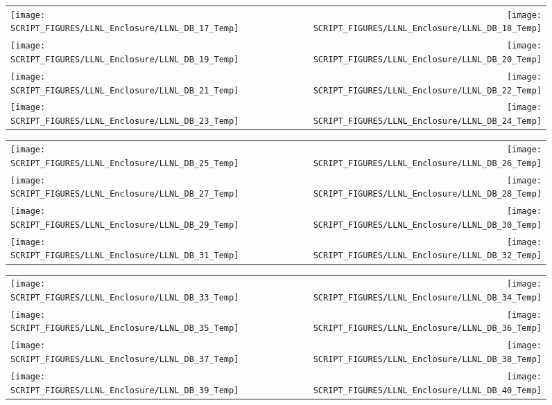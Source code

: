 \begin{figure}[!ht]
\begin{tabular*}{\textwidth}{l@{\extracolsep{\fill}}r}
\texttt{[image: SCRIPT\_FIGURES/LLNL\_Enclosure/LLNL\_DB\_17\_Temp]} &
\texttt{[image: SCRIPT\_FIGURES/LLNL\_Enclosure/LLNL\_DB\_18\_Temp]} \\
\texttt{[image: SCRIPT\_FIGURES/LLNL\_Enclosure/LLNL\_DB\_19\_Temp]} &
\texttt{[image: SCRIPT\_FIGURES/LLNL\_Enclosure/LLNL\_DB\_20\_Temp]} \\
\texttt{[image: SCRIPT\_FIGURES/LLNL\_Enclosure/LLNL\_DB\_21\_Temp]} &
\texttt{[image: SCRIPT\_FIGURES/LLNL\_Enclosure/LLNL\_DB\_22\_Temp]} \\
\texttt{[image: SCRIPT\_FIGURES/LLNL\_Enclosure/LLNL\_DB\_23\_Temp]} &
\texttt{[image: SCRIPT\_FIGURES/LLNL\_Enclosure/LLNL\_DB\_24\_Temp]}
\end{tabular*}
\end{figure}

\begin{figure}[!ht]
\begin{tabular*}{\textwidth}{l@{\extracolsep{\fill}}r}
\texttt{[image: SCRIPT\_FIGURES/LLNL\_Enclosure/LLNL\_DB\_25\_Temp]} &
\texttt{[image: SCRIPT\_FIGURES/LLNL\_Enclosure/LLNL\_DB\_26\_Temp]} \\
\texttt{[image: SCRIPT\_FIGURES/LLNL\_Enclosure/LLNL\_DB\_27\_Temp]} &
\texttt{[image: SCRIPT\_FIGURES/LLNL\_Enclosure/LLNL\_DB\_28\_Temp]} \\
\texttt{[image: SCRIPT\_FIGURES/LLNL\_Enclosure/LLNL\_DB\_29\_Temp]} &
\texttt{[image: SCRIPT\_FIGURES/LLNL\_Enclosure/LLNL\_DB\_30\_Temp]} \\
\texttt{[image: SCRIPT\_FIGURES/LLNL\_Enclosure/LLNL\_DB\_31\_Temp]} &
\texttt{[image: SCRIPT\_FIGURES/LLNL\_Enclosure/LLNL\_DB\_32\_Temp]}
\end{tabular*}
\end{figure}

\begin{figure}[!ht]
\begin{tabular*}{\textwidth}{l@{\extracolsep{\fill}}r}
\texttt{[image: SCRIPT\_FIGURES/LLNL\_Enclosure/LLNL\_DB\_33\_Temp]} &
\texttt{[image: SCRIPT\_FIGURES/LLNL\_Enclosure/LLNL\_DB\_34\_Temp]} \\
\texttt{[image: SCRIPT\_FIGURES/LLNL\_Enclosure/LLNL\_DB\_35\_Temp]} &
\texttt{[image: SCRIPT\_FIGURES/LLNL\_Enclosure/LLNL\_DB\_36\_Temp]} \\
\texttt{[image: SCRIPT\_FIGURES/LLNL\_Enclosure/LLNL\_DB\_37\_Temp]} &
\texttt{[image: SCRIPT\_FIGURES/LLNL\_Enclosure/LLNL\_DB\_38\_Temp]} \\
\texttt{[image: SCRIPT\_FIGURES/LLNL\_Enclosure/LLNL\_DB\_39\_Temp]} &
\texttt{[image: SCRIPT\_FIGURES/LLNL\_Enclosure/LLNL\_DB\_40\_Temp]}
\end{tabular*}
\end{figure}


